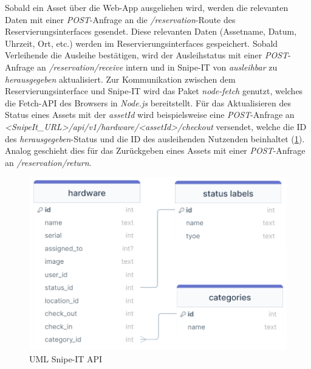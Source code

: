 Sobald ein Asset über die Web-App ausgeliehen wird, werden die relevanten Daten mit einer
\textit{POST}-Anfrage an die \textit{/reservation}-Route des Reservierungsinterfaces gesendet.
Diese relevanten Daten (Assetname, Datum, Uhrzeit, Ort, etc.) werden im Reservierungsinterfaces
gespeichert. Sobald Verleihende die Ausleihe bestätigen, wird der Ausleihstatus mit einer
\textit{POST}-Anfrage an \textit{/reservation/receive} intern und in Snipe-IT von
\textit{ausleihbar} zu \textit{herausgegeben} aktualisiert. Zur Kommunikation zwischen dem
Reservierungsinterface und Snipe-IT wird das Paket \textit{node-fetch} genutzt, welches die
Fetch-API des Browsers in \textit{Node.js} bereitstellt. Für das Aktualisieren des Status eines
Assets mit der \textit{assetId} wird beispielsweise eine \textit{POST}-Anfrage an
\textit{<SnipeIt\_URL>/api/v1/hardware/<assetId>/checkout} versendet, welche die ID des
\textit{herausgegeben}-Status und die ID des ausleihenden Nutzenden beinhaltet (\ref{fig:server}).
Analog geschieht dies für das Zurückgeben eines Assets mit einer \textit{POST}-Anfrage an
\textit{/reservation/return}.
\begin{figure}[h]
  \centering
  \includegraphics[scale=0.4]{Bilder/Code/DB_RES_INT.png}
  \caption[UML Snipe-IT API]{UML Snipe-IT API}
  \label{fig:server}
\end{figure}

